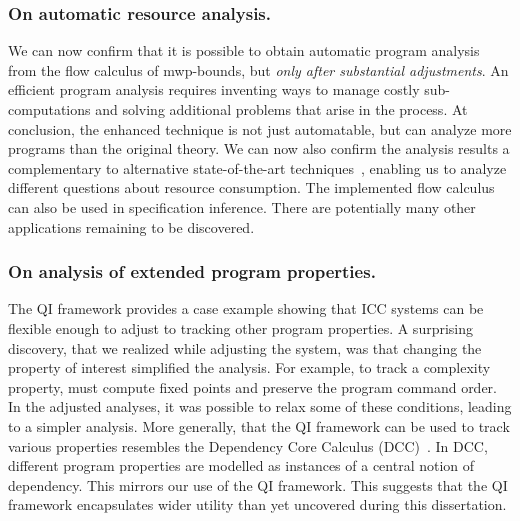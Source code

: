 \subsubsection*{On automatic resource analysis.}
We can now confirm that it is possible to obtain automatic program analysis from the flow calculus of mwp-bounds, but \emph{only after substantial adjustments}.
An efficient program analysis requires inventing ways to manage costly sub-computations and solving additional problems that arise in the process.
At conclusion, the enhanced technique is not just automatable, but can analyze more programs than the original theory.
We can now also confirm the analysis results a complementary to alternative state-of-the-art techniques~\cite[p. 5]{aubert2023b}, enabling us to analyze different questions about resource consumption.
The implemented flow calculus can also be used in specification inference.
There are potentially many other applications remaining to be discovered.

\subsubsection*{On analysis of extended program properties.}
The QI framework provides a case example showing that ICC systems can be flexible enough to adjust to tracking other program properties.
A surprising discovery, that we realized while adjusting the system, was that changing the property of interest simplified the analysis.
For example, to track a complexity property, must compute fixed points and preserve the program command order.
In the adjusted analyses, it was possible to relax some of these conditions, leading to a simpler analysis.
More generally, that the QI framework can be used to track various properties resembles the Dependency Core Calculus (DCC)~\cite{abadi1999b}.
In DCC, different program properties are modelled as instances of a central notion of dependency.
This mirrors our use of the QI framework.
This suggests that the QI framework encapsulates wider utility than yet uncovered during this dissertation.

